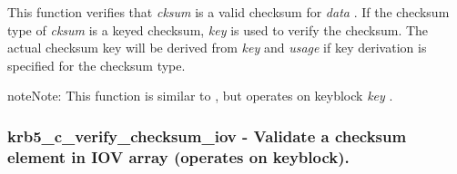 \documentclass[letterpaper,10pt,english]{sphinxmanual}
\begin{document}
This function verifies that \emph{cksum} is a valid checksum for \emph{data} . If the checksum type of \emph{cksum} is a keyed checksum, \emph{key} is used to verify the checksum. The actual checksum key will be derived from \emph{key} and \emph{usage} if key derivation is specified for the checksum type.

\begin{notice}{note}{Note:}
This function is similar to {\hyperref[appdev/refs/api/krb5_k_verify_checksum:krb5_k_verify_checksum]{}} , but operates on keyblock \emph{key} .
\end{notice}


\subsubsection{krb5\_c\_verify\_checksum\_iov -  Validate a checksum element in IOV array (operates on keyblock).}
\label{appdev/refs/api/krb5_c_verify_checksum_iov::doc}\label{appdev/refs/api/krb5_c_verify_checksum_iov:krb5-c-verify-checksum-iov-validate-a-checksum-element-in-iov-array-operates-on-keyblock}

\begin{fulllineitems}
\label{appdev/refs/api/krb5_c_verify_checksum_iov:krb5_c_verify_checksum_iov}
\end{fulllineitems}
\end{document}
